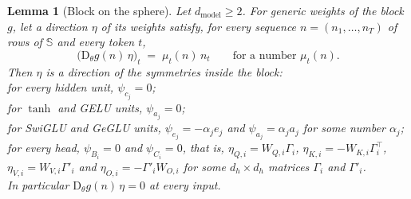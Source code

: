 \documentclass[10pt]{article}
\newtheorem{lemma}[theorem]{Lemma}
\theoremstyle{definition}
\theoremstyle{remark}
\newcommand{\dm}{d_{\mathrm{model}}}
\newcommand{\Der}{\mathrm{D}}
\begin{document}
\begin{lemma}[Block on the sphere]\label{lem:sphere}
Let $\dm \ge 2$. For generic weights of the block $g$, let a direction $\eta$ of its weights satisfy, for every sequence $n = (n_1, \dots, n_T)$ of rows of $\mathbb S$ and every token $t$,
\begin{equation}\label{eq:radial}
\big(\Der_\theta g(n)\,\eta\big)_t \;=\; \mu_t(n)\,n_t \qquad\text{for a number } \mu_t(n).
\end{equation}
Then $\eta$ is a direction of the symmetries inside the block:\\
for every hidden unit, $\psi_{c_j} = 0$;\\
for $\tanh$ and GELU units, $\psi_{a_j} = 0$;\\
for SwiGLU and GeGLU units, $\psi_{e_j} = -\alpha_je_j$ and $\psi_{a_j} = \alpha_ja_j$ for some number $\alpha_j$;\\
for every head, $\psi_{B_i} = 0$ and $\psi_{C_i} = 0$, that is, $\eta_{Q,i} = W_{Q,i}\Gamma_i$, $\eta_{K,i} = -W_{K,i}\Gamma_i^\top$, $\eta_{V,i} = W_{V,i}\Gamma'_i$ and $\eta_{O,i} = -\Gamma'_iW_{O,i}$ for some $d_h\times d_h$ matrices $\Gamma_i$ and $\Gamma'_i$.\\
In particular $\Der_\theta g(n)\,\eta = 0$ at every input.
\end{lemma}
\end{document}
